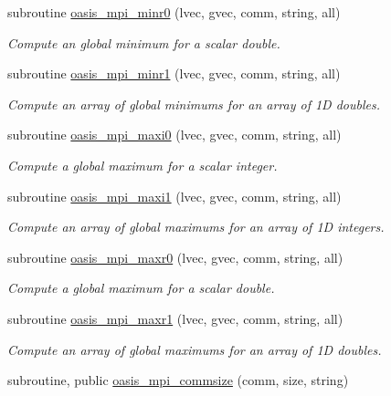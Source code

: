 \begin{DoxyCompactItemize}
subroutine \hyperlink{namespacemod__oasis__mpi_af3628ad005b1a21e8f33e3dc2be38635}{oasis\+\_\+mpi\+\_\+minr0} (lvec, gvec, comm, string, all)
\begin{DoxyCompactList}\small\item\em Compute an global minimum for a scalar double. \end{DoxyCompactList}\item 
subroutine \hyperlink{namespacemod__oasis__mpi_a29c460b836ae9ad77ee1ac21f684d188}{oasis\+\_\+mpi\+\_\+minr1} (lvec, gvec, comm, string, all)
\begin{DoxyCompactList}\small\item\em Compute an array of global minimums for an array of 1D doubles. \end{DoxyCompactList}\item 
subroutine \hyperlink{namespacemod__oasis__mpi_a0b469347d40c78c317042fa069d9baa5}{oasis\+\_\+mpi\+\_\+maxi0} (lvec, gvec, comm, string, all)
\begin{DoxyCompactList}\small\item\em Compute a global maximum for a scalar integer. \end{DoxyCompactList}\item 
subroutine \hyperlink{namespacemod__oasis__mpi_a2ba8d76b016ddde4013aecc2ca0b1d9f}{oasis\+\_\+mpi\+\_\+maxi1} (lvec, gvec, comm, string, all)
\begin{DoxyCompactList}\small\item\em Compute an array of global maximums for an array of 1D integers. \end{DoxyCompactList}\item 
subroutine \hyperlink{namespacemod__oasis__mpi_a7f46e23956ff948e039c5c1cdde0f6f3}{oasis\+\_\+mpi\+\_\+maxr0} (lvec, gvec, comm, string, all)
\begin{DoxyCompactList}\small\item\em Compute a global maximum for a scalar double. \end{DoxyCompactList}\item 
subroutine \hyperlink{namespacemod__oasis__mpi_ae57151fc4714e33d7e0e1cf0aa65ae64}{oasis\+\_\+mpi\+\_\+maxr1} (lvec, gvec, comm, string, all)
\begin{DoxyCompactList}\small\item\em Compute an array of global maximums for an array of 1D doubles. \end{DoxyCompactList}\item 
subroutine, public \hyperlink{namespacemod__oasis__mpi_adac784196d7af85611752214137dd4db}{oasis\+\_\+mpi\+\_\+commsize} (comm, size, string)

\end{DoxyCompactItemize}
